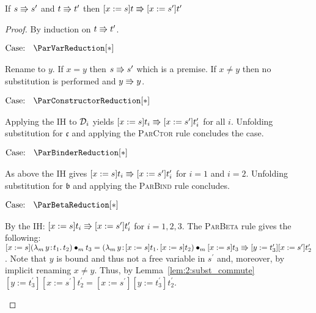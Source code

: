 \begin{lemma}
    If $s \Rrightarrow s^\prime$ and $t \Rrightarrow t^\prime$ then $[x := s]t \Rrightarrow [x := s^\prime]t^\prime$
    \label{lem:a:par_subst}
\end{lemma}
\begin{proof}
    By induction on $t \Rrightarrow t^\prime$.

    $\text{Case: }\begin{array}{c} \ParVarReduction[*] \end{array}$
    \begin{proofcase}
        Rename to $y$.
        If $x = y$ then $s \Rrightarrow s^\prime$ which is a premise.
        If $x \neq y$ then no substitution is performed and $y \Rrightarrow y$.
    \end{proofcase}

    $\text{Case: }\begin{array}{c} \ParConstructorReduction[*] \end{array}$
    \begin{proofcase}
        Applying the IH to $\mathcal{D}_{i}$ yields $[x := s]t_i \Rrightarrow [x := s^\prime]t_i^\prime$ for all $i$.
        Unfolding substitution for $\mathfrak{c}$ and applying the \textsc{ParCtor} rule concludes the case.
    \end{proofcase}

    $\text{Case: }\begin{array}{c} \ParBinderReduction[*] \end{array}$
    \begin{proofcase}
        As above the IH gives $[x := s]t_i \Rrightarrow [x := s^\prime]t_i^\prime$ for $i = 1$ and $i = 2$.
        Unfolding substitution for $\mathfrak{b}$ and applying the \textsc{ParBind} rule concludes.
    \end{proofcase}

    $\text{Case: }\begin{array}{c} \ParBetaReduction[*] \end{array}$
    \begin{proofcase}
        By the IH: $[x := s]t_i \Rrightarrow [x := s^\prime]t_i^\prime$ for $i = 1, 2, 3$.
        The \textsc{ParBeta} rule gives the following:
        $[x := s]({\lambda_m}\, y\! : \! t_1.\, t_2) \bullet_{m} t_3 = ({\lambda_m}\, y\! : \! [x := s]t_1.\, [x := s]t_2) \bullet_{m} [x := s]t_3 \Rrightarrow [y := t_3^\prime][x := s^\prime]t_2^\prime$.
        Note that $y$ is bound and thus not a free variable in $s^\prime$ and, moreover, by implicit renaming $x \neq y$.
        Thus, by Lemma~\ref{lem:2:subst_commute} $[y := t_3^\prime][x := s^\prime]t_2^\prime = [x := s^\prime][y := t_3^\prime]t_2^\prime$.
    \end{proofcase}


\end{proof}
